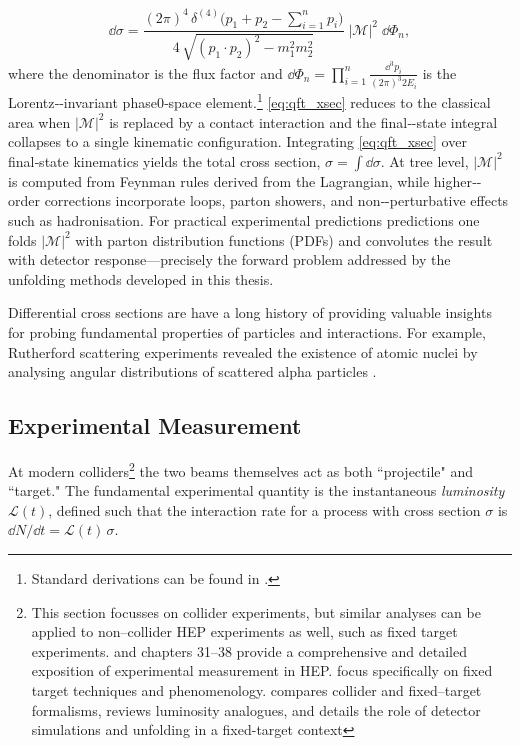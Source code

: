     \begin{equation}
      \dd\sigma =
      \frac{(2\pi)^4 \, \delta^{(4)}\!\bigl(p_1 + p_2 - \sum_{i=1}^n p_i\bigr)}
           {4\,\sqrt{(p_1\!\cdot\!p_2)^2 - m_1^2 m_2^2}}
      \; |\mathcal{M}|^2 \;
      \dd\Phi_n,
      \label{eq:qft_xsec}
    \end{equation}
    where the denominator is the flux factor and \(\dd\Phi_n = \prod_{i=1}^{n} \tfrac{\dd^3 p_i}{(2\pi)^3 2E_i}\) is the Lorentz‑-invariant phase0‑space element.\footnote{Standard derivations can be found in \cite{peskin_introduction_1995,Navas2024ReviewPhysics, Hollik2014Quantum978-1-107-03473-0, QuantumAssessment}.
    }
    \cref{eq:qft_xsec} reduces to the classical area when \(|\mathcal{M}|^2\) is replaced by a contact interaction and the final‑-state integral collapses to a single kinematic configuration.
    Integrating \cref{eq:qft_xsec} over final‑state kinematics yields the total cross section, \(\sigma = \int \dd\sigma\).
    At tree level, \(|\mathcal{M}|^2\) is computed from Feynman rules derived from the Lagrangian, while higher‑-order corrections incorporate loops, parton showers, and non‑-perturbative effects such as hadronisation.
    For practical experimental predictions predictions one folds \(|\mathcal{M}|^2\) with parton distribution functions (PDFs) and convolutes the result with detector response---precisely the forward problem addressed by the unfolding methods developed in this thesis.

Differential cross sections are have a long history of providing valuable insights for probing fundamental properties of particles and interactions.
%
For example, Rutherford scattering experiments revealed the existence of atomic nuclei by analysing angular distributions of scattered alpha particles \cite{F.R.S.1911LXXIX.Atom}.

    \subsection{Experimental Measurement}
    \label{subsec:exp_measurement}
        At modern colliders\footnote{
            This section focusses on collider experiments, but similar analyses can be applied to non--collider HEP experiments as well, such as fixed target experiments.
            \cite{leo_techniques_1994} and \cite{particle_data_group_review_2022} chapters 31--38 provide a comprehensive and detailed exposition of experimental measurement in HEP.
            \cite{Brodsky2013PhysicsBeams, AveryCrossRates} focus specifically on fixed target techniques and phenomenology.
            \cite{MuheimNuclearLaws} compares collider and fixed--target formalisms, reviews luminosity analogues, and details the role of detector simulations and unfolding in a fixed-target context
        } the two beams themselves act as both ``projectile" and ``target." 
        The fundamental experimental quantity is the instantaneous \emph{luminosity} \(\mathcal{L}(t)\), defined such that the interaction rate for a process with cross section \(\sigma\) is \(\dd N/\dd t = \mathcal{L}(t)\,\sigma\).

